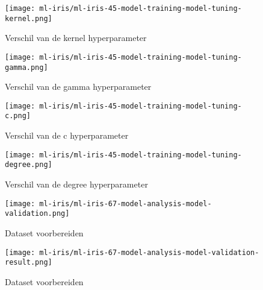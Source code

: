 \clearpage

\begin{figure}[hbt!]
  \centering
  \begin{minipage}{0.45\textwidth}
      \centering
      \texttt{[image: ml-iris/ml-iris-45-model-training-model-tuning-kernel.png]}
      \caption{Verschil van de kernel hyperparameter}
      \label{fig:appendix:ml-iris-45-model-training-model-tuning-kernel}
  \end{minipage}\hfill
  \begin{minipage}{0.45\textwidth}
      \centering
      \texttt{[image: ml-iris/ml-iris-45-model-training-model-tuning-gamma.png]}
      \caption{Verschil van de gamma hyperparameter}
      \label{fig:appendix:ml-iris-45-model-training-model-tuning-gamma}
  \end{minipage}
\end{figure}

\clearpage

\begin{figure}[hbt!]
  \centering
  \begin{minipage}{.5\textwidth}
      \centering
      \texttt{[image: ml-iris/ml-iris-45-model-training-model-tuning-c.png]}
      \caption{Verschil van de c hyperparameter}
      \label{fig:appendix:ml-iris-45-model-training-model-tuning-c}
  \end{minipage}\hfill
  \begin{minipage}{.5\textwidth}
      \centering
      \texttt{[image: ml-iris/ml-iris-45-model-training-model-tuning-degree.png]}
      \caption{Verschil van de degree hyperparameter}
      \label{fig:appendix:ml-iris-45-model-training-model-tuning-degree}
  \end{minipage}
\end{figure}

\clearpage

\begin{figure}[hbt!]
  \centering
  \texttt{[image: ml-iris/ml-iris-67-model-analysis-model-validation.png]}
  \caption{Dataset voorbereiden}
  \label{fig:appendix:ml-iris-67-model-analysis-model-validation}
\end{figure}

\begin{figure}[hbt!]
  \centering
  \texttt{[image: ml-iris/ml-iris-67-model-analysis-model-validation-result.png]}
  \caption{Dataset voorbereiden}
  \label{fig:appendix:ml-iris-67-model-analysis-model-validation-result}
\end{figure}

\newpage
